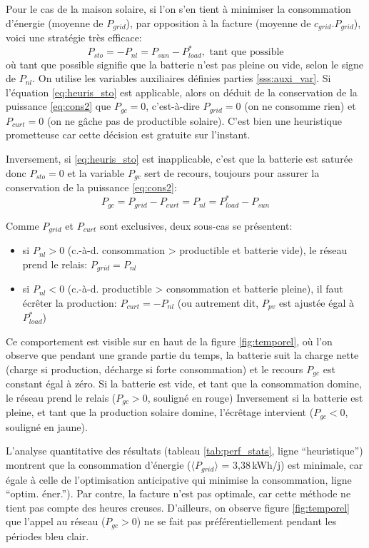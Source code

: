 \documentclass[a4paper,10pt,twocolumn]{article}
\providecommand{\avg}[1]{\langle#1\rangle}
\begin{document}
Pour le cas de la maison solaire, si l'on s'en tient à minimiser
la consommation d'énergie (moyenne de $P_{grid}$),
par opposition à la facture (moyenne de $c_{grid}.P_{grid}$),
voici une stratégie très efficace:
%
\begin{equation} \label{eq:heuris_sto}
  P_{sto} = -P_{nl} = P_{sun} - P_{load}^*, \text{ tant que possible}
\end{equation}
%
où tant que possible signifie que la batterie n'est pas pleine ou vide,
selon le signe de $P_{nl}$.
On utilise les variables auxiliaires définies parties \ref{sss:auxi_var}.
Si l'équation \eqref{eq:heuris_sto} est applicable, alors on déduit
de la conservation de la puissance \eqref{eq:cons2} que $P_{gc} = 0$,
c'est-à-dire $P_{grid} = 0$ (on ne consomme rien) et
$P_{curt} = 0$ (on ne gâche pas de productible solaire).
C'est bien une heuristique prometteuse car cette décision est gratuite
sur l'instant.

Inversement, si \eqref{eq:heuris_sto} est inapplicable,
c'est que la batterie est saturée donc $P_{sto} = 0$
et la variable $P_{gc}$ sert de recours,
toujours pour assurer la conservation de la puissance \eqref{eq:cons2}:
%
\begin{equation}
  P_{gc} = P_{grid} - P_{curt} = P_{nl} = P_{load}^* - P_{sun}
\end{equation}

Comme $P_{grid}$ et $P_{curt}$ sont exclusives, deux sous-cas se présentent:
\begin{itemize}
 \item si $P_{nl}>0$ (c.-à-d. consommation > productible et batterie vide),
 le réseau prend le relais: $P_{grid} = P_{nl}$
 \item si $P_{nl}<0$ (c.-à-d. productible > consommation et batterie pleine),
 il faut écrêter la production: $P_{curt} = - P_{nl}$
 (ou autrement dit, $P_{pv}$ est ajustée égal à $P_{load}^*$)
\end{itemize}

Ce comportement est visible sur en haut de la figure \ref{fig:temporel},
où l'on observe que pendant une grande partie du temps,
la batterie suit la charge nette (charge si production, décharge si forte consommation)
et le recours $P_{gc}$ est constant égal à zéro.
Si la batterie est vide, et tant que la consommation domine,
le réseau prend le relais ($P_{gc}>0$, souligné en rouge)
Inversement si la batterie est pleine, et tant que la production solaire domine,
l'écrêtage intervient ($P_{gc}<0$, souligné en jaune).

L'analyse quantitative des résultats (tableau \ref{tab:perf_stats}, ligne ``heuristique'')
montrent que la consommation d'énergie ($\avg{P_{grid}}$ = 3,38\,kWh/j) est minimale, car égale à celle de 
l'optimisation anticipative qui minimise la consommation, ligne ``optim. éner.'').
Par contre, la facture n'est pas optimale, car cette méthode ne tient pas compte
des heures creuses. D'ailleurs, on observe figure \ref{fig:temporel}
que l'appel au réseau ($P_{gc}>0$) ne se fait pas préférentiellement pendant
les périodes bleu clair.
\end{document}
